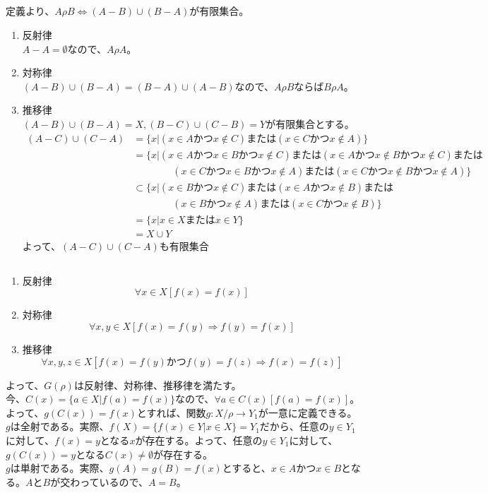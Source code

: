 \documentclass{jsarticle}
\begin{document}
\subsection{}
定義より、$A\rho B\Longleftrightarrow (A-B)\cup(B-A)が有限集合$。
\begin{enumerate}
\item 反射律\\
$A-A=\emptyset$なので、$A\rho A$。
\item 対称律\\
$(A-B)\cup(B-A)=(B-A)\cup(A-B)$なので、$A\rho B$ならば$B\rho A$。
\item 推移律\\
$(A-B)\cup(B-A)=X,(B-C)\cup(C-B)=Y$が有限集合とする。
\begin{align*}
(A-C)\cup(C-A)&=\{x|(x\in A かつ x\notin C)または(x\in Cかつx\notin A)\}\\
&=\{x|(x\in A かつ x\in B かつ x\notin C)または(x\in A かつ x\notin Bかつx\notin C)または\\
&\qquad\qquad(x\in Cかつx\in Bかつx\notin A)または(x\in Cかつx\notin Bかつx\notin A)\}\\
&\subset\{x|(x\in B かつ x\notin C)または(x\in A かつ x\notin B)または\\
&\qquad\qquad(x\in Bかつx\notin A)または(x\in Cかつx\notin B)\}\\
&=\{x|x\in X またはx\in Y\}\\
&=X\cup Y
\end{align*}
よって、$(A-C)\cup(C-A)$も有限集合
\end{enumerate}


\subsection{}
\begin{enumerate}
\item 反射律
\[\forall x\in X[f(x)=f(x)]\]
\item 対称律
\[\forall x,y\in X[f(x)=f(y)\Longrightarrow f(y)=f(x)]\]
\item 推移律
\[\forall x,y,z\in X[f(x)=f(y) かつf(y)=f(z)\Longrightarrow f(x)=f(z)]\]
\end{enumerate}
よって、$G(\rho)$は反射律、対称律、推移律を満たす。\\
今、$C(x)=\{a\in X|f(a)=f(x)\}$なので、$\forall a\in C(x)[f(a)=f(x)]$。よって、$g(C(x))=f(x)$とすれば、関数$g:X/\rho\to Y_1$が一意に定義できる。\\
$g$は全射である。実際、$f(X)=\{f(x)\in Y|x\in X\}=Y_1$だから、任意の$y\in Y_1$に対して、$f(x)=y$となる$x$が存在する。よって、任意の$y\in Y_1$に対して、$g(C(x))=y$となる$C(x)\neq\emptyset$が存在する。\\
$g$は単射である。実際、$g(A)=g(B)=f(x)$とすると、$x\in Aかつx\in B$となる。$A$と$B$が交わっているので、$A=B$。
\end{document}
